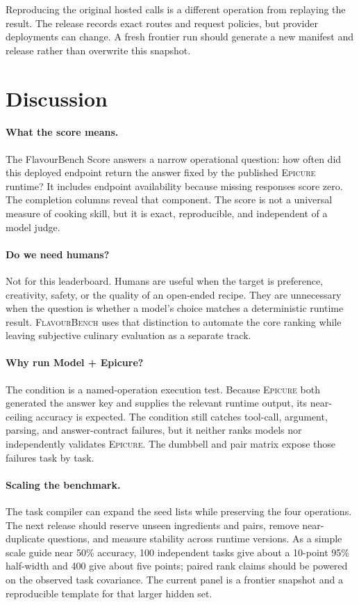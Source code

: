 \documentclass{article}
\newcommand{\system}{\textsc{FlavourBench}}
\newcommand{\epicure}{\textsc{Epicure}}
\begin{document}
Reproducing the original hosted calls is a different operation from replaying the result. The
release records exact routes and request policies, but provider deployments can change. A fresh
frontier run should generate a new manifest and release rather than overwrite this snapshot.

\section{Discussion}
\label{sec:discussion}

\paragraph{What the score means.}
The FlavourBench Score answers a narrow operational question: how often did this deployed endpoint
return the answer fixed by the published \epicure{} runtime? It includes endpoint availability
because missing responses score zero. The completion columns reveal that component. The score is
not a universal measure of cooking skill, but it is exact, reproducible, and independent of a
model judge.

\paragraph{Do we need humans?}
Not for this leaderboard. Humans are useful when the target is preference, creativity, safety, or
the quality of an open-ended recipe. They are unnecessary when the question is whether a model's
choice matches a deterministic runtime result. \system{} uses that distinction to automate the
core ranking while leaving subjective culinary evaluation as a separate track.

\paragraph{Why run Model + Epicure?}
The condition is a named-operation execution test. Because \epicure{} both generated the answer
key and supplies the relevant runtime output, its near-ceiling accuracy is expected. The condition
still catches tool-call, argument, parsing, and answer-contract failures, but it neither ranks
models nor independently validates \epicure{}. The dumbbell and pair matrix expose those failures
task by task.

\paragraph{Scaling the benchmark.}
The task compiler can expand the seed lists while preserving the four operations. The next release
should reserve unseen ingredients and pairs, remove near-duplicate questions, and measure stability
across runtime versions. As a simple scale guide near 50\% accuracy, 100 independent tasks give
about a 10-point 95\% half-width and 400 give about five points; paired rank claims should be powered
on the observed task covariance. The current panel is a frontier snapshot and a reproducible
template for that larger hidden set.
\end{document}
